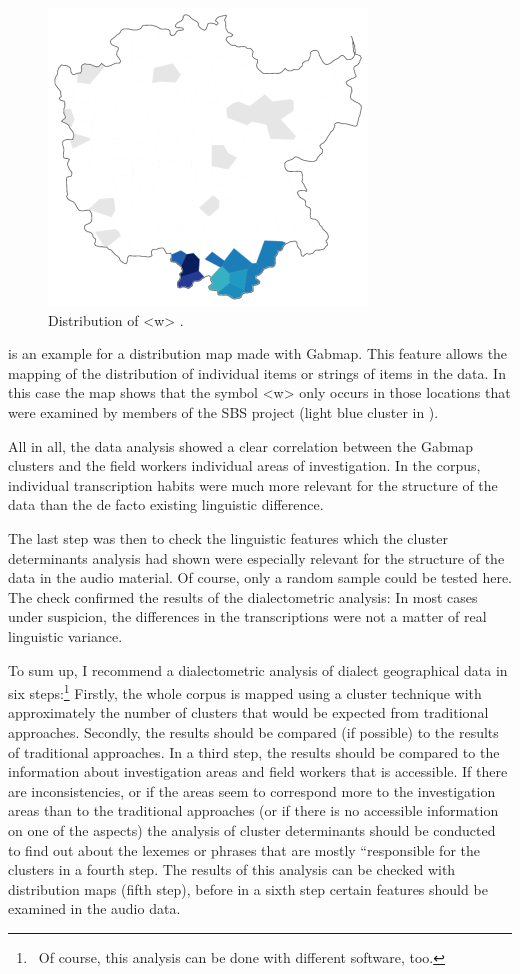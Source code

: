 \documentclass[output=paper]{LSP/langsci}
\begin{document}
\begin{figure}
\includegraphics[width=.5\textwidth]{illustrations/mathus_fig10}
\caption{Distribution of {\textless}w{\textgreater} \citep[226]{mathussek_sprachraume_2014}.}
\label{fig:10}
\end{figure}
  
 is an example for a distribution map made with Gabmap. This feature allows the mapping of the distribution of individual items or strings of items in the data. In this case the map shows that the symbol {\textless}w{\textgreater} only occurs in those locations that were examined by members of the SBS project (light blue cluster in ).

All in all, the data analysis showed a clear correlation between the Gabmap clusters and the field workers{\textquotesingle} individual areas of investigation. In the corpus, individual transcription habits were much more relevant for the structure of the data than the de facto existing linguistic difference.

The last step was then to check the linguistic features which the cluster determinants analysis had shown were especially relevant for the structure of the data in the audio material. Of course, only a random sample could be tested here. The check confirmed the results of the dialectometric analysis: In most cases under suspicion, the differences in the transcriptions were not a matter of real linguistic variance.

To sum up, I recommend a dialectometric analysis of dialect geographical data in six steps:\footnote{\ Of course, this analysis can be done with different software, too.} Firstly, the whole corpus is mapped using a cluster technique with approximately the number of clusters that would be expected from traditional approaches. Secondly, the results should be compared (if possible) to the results of traditional approaches. In a third step, the results should be compared to the information about investigation areas and field workers that is accessible. If there are inconsistencies, or if the areas seem to correspond more to the investigation areas than to the traditional approaches (or if there is no accessible information on one of the aspects) the analysis of cluster determinants should be conducted to find out about the lexemes or phrases that are mostly ``responsible{\textquotedbl} for the clusters in a fourth step. The results of this analysis can be checked with distribution maps (fifth step), before in a sixth step certain features should be examined in the audio data.
\end{document}
